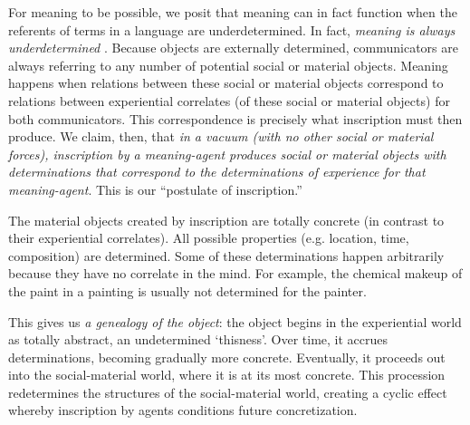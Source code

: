 
For meaning to be possible, we posit that meaning can in fact function when the referents of terms in a language are underdetermined. In fact, \textit{meaning is always underdetermined} \cite{Quine:WordObject}. Because objects are externally determined, communicators are always referring to any number of potential social or material objects. Meaning happens when relations between these social or material objects correspond to relations between experiential correlates (of these social or material objects) for both communicators. This correspondence is precisely what inscription must then produce. We claim, then, that \textit{in a vacuum (with no other social or material forces), inscription by a meaning-agent produces social or material objects with determinations that correspond to the determinations of experience for that meaning-agent}. This is our ``postulate of inscription.''

The material objects created by inscription are totally concrete (in contrast to their experiential correlates). All possible properties (e.g. location, time, composition) are determined. Some of these determinations happen arbitrarily because they have no correlate in the mind. For example, the chemical makeup of the paint in a painting is usually not determined for the painter.

This gives us \textit{a genealogy of the object}: the object begins in the experiential world as totally abstract, an undetermined `thisness'. Over time, it accrues determinations, becoming gradually more concrete. Eventually, it proceeds out into the social-material world, where it is at its most concrete. This procession redetermines the structures of the social-material world, creating a cyclic effect whereby inscription by agents conditions future concretization.

